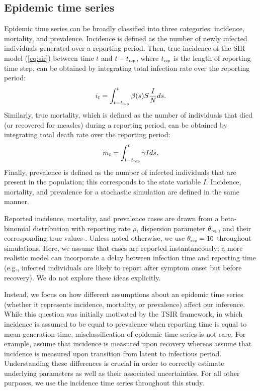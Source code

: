 \documentclass{article}
\newcommand{\eref}[1]{(\ref{eq:#1})}
\newcommand{\tsub}[2]{#1_{{\textrm{\tiny #2}}}}
\begin{document}
\subsection{Epidemic time series}

Epidemic time series can be broadly classified into three categories: incidence, mortality, and prevalence.
Incidence is defined as the number of newly infected individuals generated over a reporting period.
Then, true incidence of the SIR model \eref{sir} between time $t$ and $t-\tsub{t}{rep}$, where $\tsub{t}{rep}$ is the length of reporting time step, can be obtained by integrating total infection rate over the reporting period:
\begin{equation}
i_t = \int_{t-\tsub{t}{rep}}^{t} \beta(s) S \frac{I}{N} ds.
\end{equation}
Similarly, true mortality, which is defined as the number of individuals that died (or recovered for measles) during a reporting period, can be obtained by integrating total death rate over the reporting period:
\begin{equation}
m_t = \int_{t-\tsub{t}{rep}}^{t} \gamma I ds.
\end{equation}
Finally, prevalence is defined as the number of infected individuals that are present in the population; 
this corresponds to the state variable $I$. 
Incidence, mortality, and prevalence for a stochastic simulation are defined in the same manner.

Reported incidence, mortality, and prevalence cases are drawn from a beta-binomial distribution with reporting rate $\rho$, dispersion parameter $\tsub{\theta}{rep}$, and their corresponding true values \citep{morris1997disentangling}.
Unless noted otherwise, we use $\tsub{\theta}{rep} = 10$ throughout simulations.
Here, we assume that cases are reported instantaneously; 
a more realistic model can incorporate a delay between infection time and reporting time (e.g., infected individuals are likely to report after symptom onset but before recovery).
We do not explore these ideas explicitly.

Instead, we focus on how different assumptions about an epidemic time series (whether it represents incidence, mortality, or prevalence) affect our inference.
While this question was initially motivated by the TSIR framework, in which incidence is assumed to be equal to prevalence when reporting time is equal to mean generation time, 
misclassification of epidemic time series is not rare.
For example, \cite{he2009plug} assume that incidence is measured upon recovery whereas \cite{hooker2010parameterizing, althaus2014estimating} assume that incidence is measured upon transition from latent to infectious period.
Understanding these differences is crucial in order to correctly estimate underlying parameters as well as their associated uncertainties.
For all other purposes, we use the incidence time series throughout this study.
\end{document}
